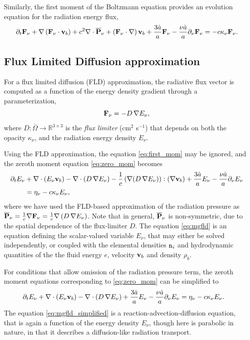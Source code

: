 \documentclass[10pt]{article}
\renewcommand{\(}{\left(}
\renewcommand{\)}{\right)}
\newcommand{\vb}{{\bf v}_b}
\newcommand{\Omegabar}{\bar{\Omega}}
\newcommand{\adot}{\dot{a}}
\newcommand{\rhob}{\rho_b}
\newcommand{\Enu}{E_{\nu}}
\newcommand{\Fnu}{{\bf F}_{\nu}}
\newcommand{\Pnu}{\overline{\bf P}_{\nu}}
\newcommand{\R}{\mathbb{R}}
\newcommand{\mn}{{\tt n}}
\begin{document}
Similarly, the first moment of the Boltzmann equation provides an
evolution equation for the radiation energy flux,
\begin{equation}
\label{eq:first_mom}
  \partial_{t} \Fnu + \nabla\(\Fnu\cdot\vb\) 
    + c^2 \nabla\cdot\Pnu + \(\Fnu\cdot\nabla\)\vb
    + \frac{3 \adot}{a} \Fnu - \frac{\nu \adot}{a}\partial_{\nu} \Fnu
  = -c \kappa_{\nu} \Fnu.
\end{equation}



\subsection{Flux Limited Diffusion approximation}
\label{subsec:fld_approx}

For a flux limited diffusion (FLD) approximation, the radiative flux
vector is computed as a function of the energy density gradient through
a parameterization, 
\begin{equation}
\label{eq:fld_approx}
  \Fnu = -D\,\nabla\Enu,
\end{equation}
where $D:\Omegabar\rightarrow\R^{3\times3}$ is the {\em flux limiter}
(cm$^2$ s$^{-1}$) that depends on both the opacity $\kappa_\nu$, and
the radiation energy density $\Enu$.

Using the FLD approximation, the equation \eqref{eq:first_mom} may be
ignored, and the zeroth moment equation \eqref{eq:zero_mom} becomes
\begin{equation}
\label{eq:mgfld}
\begin{split}
   \partial_{t} \Enu &+ \nabla\cdot(\Enu\vb) 
     - \nabla\cdot(D\,\nabla\Enu)
     - \frac{1}{c}\(\nabla(D\,\nabla\Enu)\):(\nabla\vb) 
     + \frac{3 \adot}{a} \Enu - \frac{\nu \adot}{a}\partial_{\nu}\Enu \\
   &= \eta_{\nu} - c \kappa_{\nu} \Enu,
\end{split}
\end{equation}
where we have used the FLD-based approximation of the radiation
pressure as $\Pnu = \frac{1}{c}\nabla\Fnu =
\frac{1}{c}\nabla\(D\,\nabla\Enu\)$.  Note that in general, $\Pnu$ is  
non-symmetric, due to the spatial dependence of the flux-limiter $D$.
The equation \eqref{eq:mgfld} is an equation defining the
scalar-valued variable $\Enu$, that may either be solved
independently, or coupled with the elemental densities $\mn_i$ and
hydrodynamic quantities of the the fluid energy $e$, velocity
$\vb$ and density $\rhob$.

For conditions that allow omission of the radiation pressure term, the
zeroth moment equations corresponding to \eqref{eq:zero_mom} can be
simplified to
\begin{align}
  \label{eq:mgfld_simplified}
  &\partial_{t} \Enu + \nabla\cdot(\Enu\vb) 
    - \nabla\cdot(D\,\nabla\Enu) 
     + \frac{3 \adot}{a} \Enu - \frac{\nu \adot}{a}\partial_{\nu}\Enu
    = \eta_{\nu} - c \kappa_{\nu} \Enu.
\end{align}
The equation \eqref{eq:mgfld_simplified} is a
reaction-advection-diffusion equation, that is again a function of the
energy density $\Enu$, though here is parabolic in nature, in that it
describes a diffusion-like radiation transport.  
\end{document}
